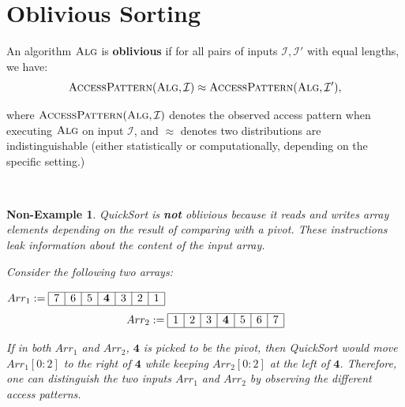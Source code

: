 \newcommand{\rsmpl}{\xleftarrow{\$}}

\newcommand{\alg}{\textsc{Alg}}

\newcommand{\ap}{\textsc{AccessPattern}}
\newtheorem{nonexample}[theorem]{Non-Example}


\section{Oblivious Sorting}

\begin{definition}
    An algorithm $\alg$ is \textbf{oblivious} if for all pairs of inputs $\mathcal{I}, \mathcal{I}'$ with equal lengths, we have:
    \[\ap(\alg, \mathcal{I}) \approx \ap(\alg, \mathcal{I}'), \]

    where $\ap(\alg, \mathcal{I})$ denotes the observed access pattern when executing $\alg$ on input $\mathcal{I}$, and $\approx$ denotes two distributions are indistinguishable (either statistically or computationally, depending on the specific setting.)
\end{definition}

$ $

\begin{nonexample}
    QuickSort is \textbf{not} oblivious because it reads and writes array elements depending on the result of comparing with a pivot. These instructions leak information about the content of the input array.

    Consider the following two arrays: 
    \begin{center} 
 $Arr_1 := \begin{array}{|c|c|c|c|c|c|c|} \hline 
 7 & 6 & 5 & \textbf{4} & 3 & 2 & 1
 \\ 
\hline
\end{array}
$
 \[ Arr_2 := \begin{array}{|c|c|c|c|c|c|c|} \hline 
1 & 2 & 3 & \textbf{4} & 5 & 6 & 7
\\ 
\hline
\end{array}
\]

\end{center}

If in both $Arr_1$ and $Arr_2$, $\textbf{4}$ is picked to be the pivot, then QuickSort would move $Arr_1[0:2]$ to the right of $\textbf{4}$ while keeping $Arr_2[0:2]$ at the left of $\textbf{4}$. Therefore, one can distinguish the two inputs $Arr_1$ and $Arr_2$ by observing the different access patterns. 

\end{nonexample}

